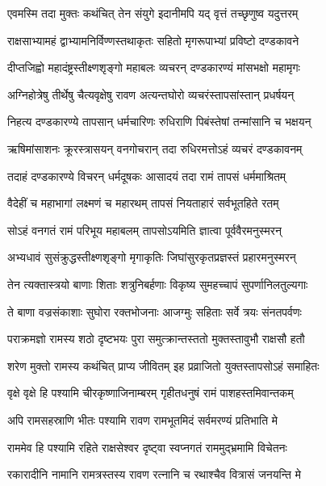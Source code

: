 
\twolineshloka
{एवमस्मि तदा मुक्तः कथंचित् तेन संयुगे}
{इदानीमपि यद् वृत्तं तच्छृणुष्व यदुत्तरम्} %

\twolineshloka
{राक्षसाभ्यामहं द्वाभ्यामनिर्विण्णस्तथाकृतः}
{सहितो मृगरूपाभ्यां प्रविष्टो दण्डकावने} %

\twolineshloka
{दीप्तजिह्वो महादंष्ट्रस्तीक्ष्णशृङ्गो महाबलः}
{व्यचरन् दण्डकारण्यं मांसभक्षो महामृगः} %

\twolineshloka
{अग्निहोत्रेषु तीर्थेषु चैत्यवृक्षेषु रावण}
{अत्यन्तघोरो व्यचरंस्तापसांस्तान् प्रधर्षयन्} %

\twolineshloka
{निहत्य दण्डकारण्ये तापसान् धर्मचारिणः}
{रुधिराणि पिबंस्तेषां तन्मांसानि च भक्षयन्} %

\twolineshloka
{ऋषिमांसाशनः क्रूरस्त्रासयन् वनगोचरान्}
{तदा रुधिरमत्तोऽहं व्यचरं दण्डकावनम्} %

\twolineshloka
{तदाहं दण्डकारण्ये विचरन् धर्मदूषकः}
{आसादयं तदा रामं तापसं धर्ममाश्रितम्} %

\twolineshloka
{वैदेहीं च महाभागां लक्ष्मणं च महारथम्}
{तापसं नियताहारं सर्वभूतहिते रतम्} %

\twolineshloka
{सोऽहं वनगतं रामं परिभूय महाबलम्}
{तापसोऽयमिति ज्ञात्वा पूर्ववैरमनुस्मरन्} %

\twolineshloka
{अभ्यधावं सुसंक्रुद्धस्तीक्ष्णशृङ्गो मृगाकृतिः}
{जिघांसुरकृतप्रज्ञस्तं प्रहारमनुस्मरन्} %

\twolineshloka
{तेन त्यक्तास्त्रयो बाणाः शिताः शत्रुनिबर्हणाः}
{विकृष्य सुमहच्चापं सुपर्णानिलतुल्यगाः} %

\twolineshloka
{ते बाणा वज्रसंकाशाः सुघोरा रक्तभोजनाः}
{आजग्मुः सहिताः सर्वे त्रयः संनतपर्वणः} %

\twolineshloka
{पराक्रमज्ञो रामस्य शठो दृष्टभयः पुरा}
{समुत्क्रान्तस्ततो मुक्तस्तावुभौ राक्षसौ हतौ} %

\twolineshloka
{शरेण मुक्तो रामस्य कथंचित् प्राप्य जीवितम्}
{इह प्रव्राजितो युक्तस्तापसोऽहं समाहितः} %

\twolineshloka
{वृक्षे वृक्षे हि पश्यामि चीरकृष्णाजिनाम्बरम्}
{गृहीतधनुषं रामं पाशहस्तमिवान्तकम्} %

\twolineshloka
{अपि रामसहस्राणि भीतः पश्यामि रावण}
{रामभूतमिदं सर्वमरण्यं प्रतिभाति मे} %

\twolineshloka
{राममेव हि पश्यामि रहिते राक्षसेश्वर}
{दृष्ट्वा स्वप्नगतं राममुद्भ्रमामि विचेतनः} %

\twolineshloka
{रकारादीनि नामानि रामत्रस्तस्य रावण}
{रत्नानि च रथाश्चैव वित्रासं जनयन्ति मे} %

